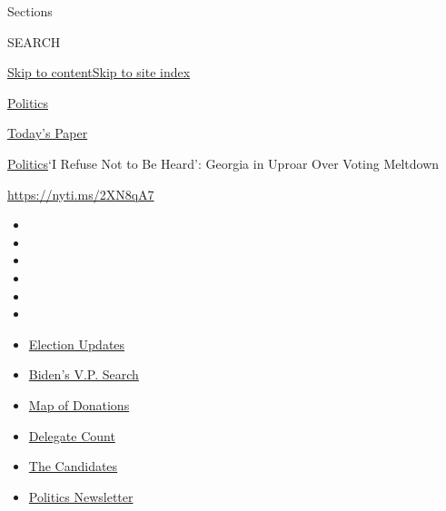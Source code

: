 Sections

SEARCH

\protect\hyperlink{site-content}{Skip to
content}\protect\hyperlink{site-index}{Skip to site index}

\href{https://www.nytimes.com/section/politics}{Politics}

\href{https://myaccount.nytimes.com/auth/login?response_type=cookie\&client_id=vi}{}

\href{https://www.nytimes.com/section/todayspaper}{Today's Paper}

\href{/section/politics}{Politics}\textbar{}`I Refuse Not to Be Heard':
Georgia in Uproar Over Voting Meltdown

\url{https://nyti.ms/2XN8qA7}

\begin{itemize}
\item
\item
\item
\item
\item
\item
\end{itemize}

\begin{itemize}
\item
  \href{https://www.nytimes.com/2020/08/04/us/elections/primary-election-michigan-arizona-kansas.html?action=click\&pgtype=Article\&state=default\&region=TOP_BANNER\&context=storylines_menu}{Election
  Updates}
\item
  \href{https://www.nytimes.com/article/biden-vice-president-2020.html?action=click\&pgtype=Article\&state=default\&region=TOP_BANNER\&context=storylines_menu}{Biden's
  V.P. Search}
\item
  \href{https://www.nytimes.com/interactive/2020/07/24/us/politics/trump-biden-campaign-donors.html?action=click\&pgtype=Article\&state=default\&region=TOP_BANNER\&context=storylines_menu}{Map
  of Donations}
\item
  \href{https://www.nytimes.com/interactive/2020/us/elections/delegate-count-primary-results.html?action=click\&pgtype=Article\&state=default\&region=TOP_BANNER\&context=storylines_menu}{Delegate
  Count}
\item
  \href{https://www.nytimes.com/interactive/2019/us/politics/2020-presidential-candidates.html?action=click\&pgtype=Article\&state=default\&region=TOP_BANNER\&context=storylines_menu}{The
  Candidates}
\item
  \href{https://www.nytimes.com/newsletters/politics?action=click\&pgtype=Article\&state=default\&region=TOP_BANNER\&context=storylines_menu}{Politics
  Newsletter}
\end{itemize}

